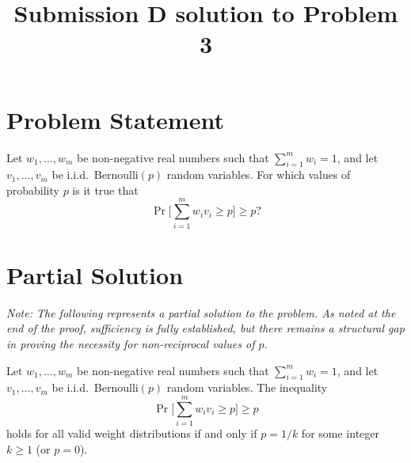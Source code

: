 \title{Submission D solution to Problem 3}
\date{}
\maketitle


\section*{Problem Statement}

Let $w_1, \ldots, w_m$ be non-negative real numbers such that $\sum_{i=1}^m w_i=1$, and let $v_1, \ldots, v_m$ be i.i.d.\ Bernoulli$(p)$ random variables. For which values of probability $p$ is it true that
\[\Pr\Big[\sum_{i=1}^m w_i v_i\geq p\Big]\geq p?\]

\section*{Partial Solution}

\textit{Note: The following represents a partial solution to the problem. As noted at the end of the proof, sufficiency is fully established, but there remains a structural gap in proving the necessity for non-reciprocal values of $p$.}

\begin{theorem}
Let $w_1, \ldots, w_m$ be non-negative real numbers such that $\sum_{i=1}^m w_i = 1$, and let $v_1, \ldots, v_m$ be i.i.d.\ Bernoulli$(p)$ random variables. The inequality 
\[\Pr\Big[\sum_{i=1}^m w_i v_i\geq p\Big]\geq p\]
holds for all valid weight distributions if and only if $p = 1/k$ for some integer $k \ge 1$ (or $p=0$).
\end{theorem}

